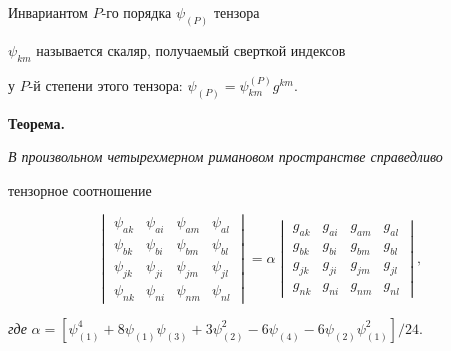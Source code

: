 \begin{defn}


Инвариантом $P$-го порядка $\psi_{(P)}$ тензора


$\psi_{km}$ называется скаляр, получаемый сверткой индексов


у $P$-й степени этого тензора: $ \psi_{(P)}=\psi^{(P)}_{km}g^{km}.$


\end{defn}





{\bf Теорема.}


{\it В произвольном четырехмерном римановом пространстве справедливо


тензорное соотношение}


\begin{equation}


\begin{vmatrix}


\psi_{ak}&\psi_{ai}&\psi_{am}&\psi_{al}\\


\psi_{bk}&\psi_{bi}&\psi_{bm}&\psi_{bl}\\


\psi_{jk}&\psi_{ji}&\psi_{jm}&\psi_{jl}\\


\psi_{nk}&\psi_{ni}&\psi_{nm}&\psi_{nl}


\end{vmatrix}


=\alpha


\begin{vmatrix}


g_{ak}&g_{ai}&g_{am}&g_{al}\\


g_{bk}&g_{bi}&g_{bm}&g_{bl}\\


g_{jk}&g_{ji}&g_{jm}&g_{jl}\\


g_{nk}&g_{ni}&g_{nm}&g_{nl}


\end{vmatrix}


,


\end{equation}


{\it где} $\alpha =[\psi_{(1)}^4+8\psi_{(1)}\psi_{(3)}+


3\psi_{(2)}^2-6\psi_{(4)}-6\psi_{(2)}\psi_{(1)}^2]/24.$


\smallskip






